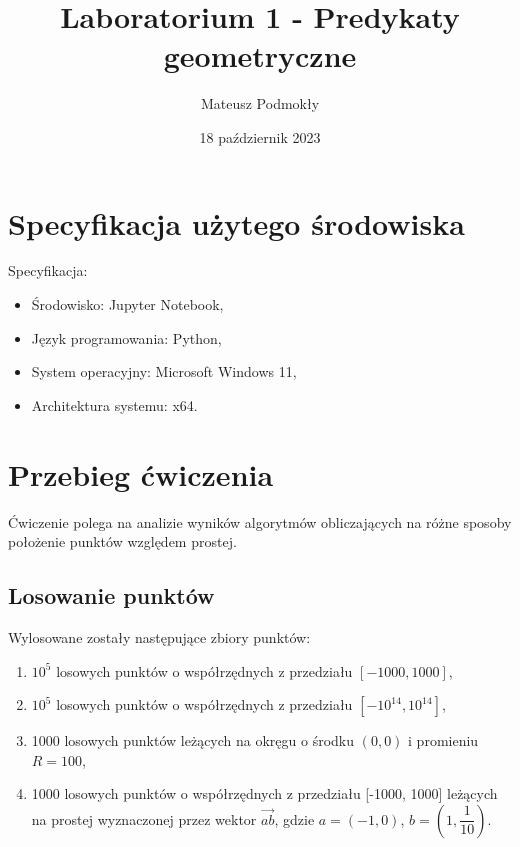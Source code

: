 \documentclass[11pt]{scrartcl}
\title{Laboratorium 1 - Predykaty geometryczne}
\author{Mateusz Podmokły}
\date{18 październik 2023}
\begin{document}
    \maketitle
    \section{Specyfikacja użytego środowiska}

    Specyfikacja:

    \begin{itemize}
        \item Środowisko: Jupyter Notebook,
        \item Język programowania: Python,
        \item System operacyjny: Microsoft Windows 11,
        \item Architektura systemu: x64.
    \end{itemize}
    \section{Przebieg ćwiczenia}

    Ćwiczenie polega na analizie wyników algorytmów obliczających na różne sposoby
    położenie punktów względem prostej.

    \subsection{Losowanie punktów}

    Wylosowane zostały następujące zbiory punktów:

    \begin{enumerate}
        \item \(10^5\) losowych punktów o współrzędnych z przedziału \([-1000,1000]\),
        \item \(10^5\) losowych punktów o współrzędnych z przedziału \([-10^{14},10^{14}]\),
        \item 1000 losowych punktów leżących na okręgu o środku \((0,0)\)
        i promieniu $R=100$,
        \item 1000 losowych punktów o współrzędnych z przedziału [-1000, 1000]
        leżących na prostej wyznaczonej przez wektor $\overrightarrow{ab}$, gdzie
        $a=(-1,0)$, $b=(1,\dfrac{1}{10})$.
    \end{enumerate}
\end{document}
